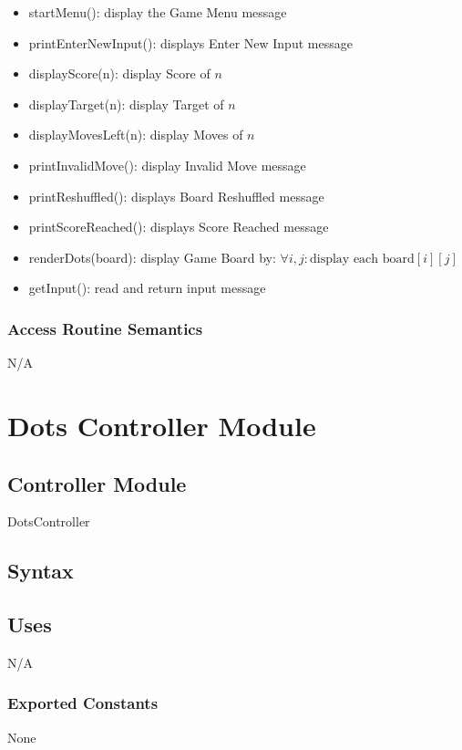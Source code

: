 \documentclass[12pt]{article}
\begin{document}
\begin{itemize}

\item startMenu(): display the Game Menu message
\item printEnterNewInput(): displays Enter New Input message
\item displayScore(n): display Score of $n$ 
\item displayTarget(n): display Target of $n$ 
\item displayMovesLeft(n): display Moves of $n$ 
\item printInvalidMove(): display Invalid Move message
\item printReshuffled(): displays Board Reshuffled message
\item printScoreReached(): displays Score Reached message
\item renderDots(board): display Game Board by: $\forall i, j: \mbox{display each }  \mbox{board}[i][j] $
\item getInput(): read and return input message

\end{itemize}

\subsubsection* {Access Routine Semantics}
N/A

\newpage

\section* {Dots Controller Module}

\subsection* {Controller Module}

DotsController

\subsection* {Syntax}

\subsection* {Uses}

N/A

\subsubsection* {Exported Constants}
None
\end{document}
